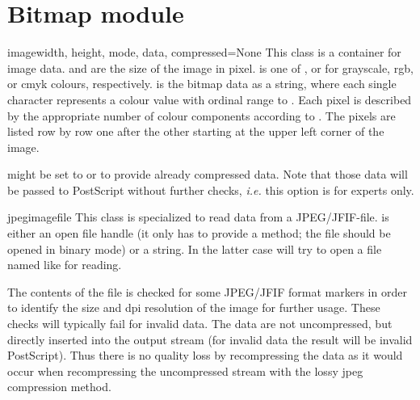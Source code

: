 \section{Bitmap module}

\begin{classdesc}{image}{width, height, mode, data, compressed=None}
  This class is a container for image data.  and
   are the size of the image in pixel.  is one
  of ,  or  for
  grayscale, rgb, or cmyk colours, respectively.  is the
  bitmap data as a string, where each single character represents a
  colour value with ordinal range  to . Each pixel
  is described by the appropriate number of colour components
  according to . The pixels are listed row by row one after
  the other starting at the upper left corner of the image.

   might be set to  or  to
  provide already compressed data. Note that those data will be passed
  to PostScript without further checks, \emph{i.e.} this option is for
  experts only.
\end{classdesc}

\begin{classdesc}{jpegimage}{file}
  This class is specialized to read data from a JPEG/JFIF-file.
   is either an open file handle (it only has to provide a
   method; the file should be opened in binary mode) or
  a string. In the latter case  will try to open a
  file named like  for reading.

  The contents of the file is checked for some JPEG/JFIF format
  markers in order to identify the size and dpi resolution of the
  image for further usage. These checks will typically fail for
  invalid data. The data are not uncompressed, but directly inserted
  into the output stream (for invalid data the result will be invalid
  PostScript). Thus there is no quality loss by recompressing the data
  as it would occur when recompressing the uncompressed stream with
  the lossy jpeg compression method.
\end{classdesc}

